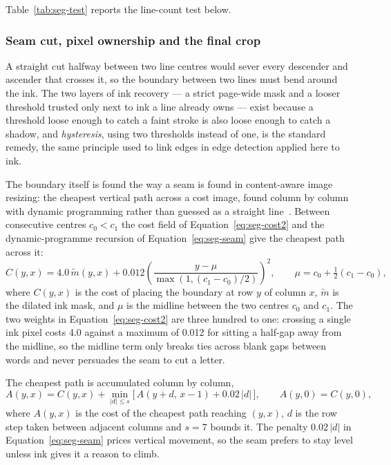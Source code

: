Table~\ref{tab:seg-test} reports the line-count test below.

\subsubsection{Seam cut, pixel ownership and the final crop}

A straight cut halfway between two line centres would sever every descender and ascender that crosses it, so the boundary between two lines must bend around the ink. The two layers of ink recovery --- a strict page-wide mask and a looser threshold trusted only next to ink a line already owns --- exist because a threshold loose enough to catch a faint stroke is also loose enough to catch a shadow, and \emph{hysteresis}, using two thresholds instead of one, is the standard remedy, the same principle used to link edges in edge detection applied here to ink.

The boundary itself is found the way a seam is found in content-aware image resizing: the cheapest vertical path across a cost image, found column by column with dynamic programming rather than guessed as a straight line~\cite[p.~10:3]{avidan2007}. Between consecutive centres $c_0<c_1$ the cost field of Equation~\ref{eq:seg-cost2} and the dynamic-programme recursion of Equation~\ref{eq:seg-seam} give the cheapest path across it:
\begin{equation}
C(y,x)=4.0\,\tilde m(y,x)+0.012\left(\frac{y-\mu}{\max(1,(c_1-c_0)/2)}\right)^{\!2},\qquad \mu=c_0+\tfrac12(c_1-c_0),
\label{eq:seg-cost2}
\end{equation}
where $C(y,x)$ is the cost of placing the boundary at row $y$ of column $x$, $\tilde m$ is the dilated ink mask, and $\mu$ is the midline between the two centres $c_0$ and $c_1$. The two weights in Equation~\ref{eq:seg-cost2} are three hundred to one: crossing a single ink pixel costs 4.0 against a maximum of 0.012 for sitting a half-gap away from the midline, so the midline term only breaks ties across blank gaps between words and never persuades the seam to cut a letter.

The cheapest path is accumulated column by column,
\begin{equation}
A(y,x)=C(y,x)+\min_{|d|\le s}\bigl[\,A(y+d,\,x-1)+0.02\,|d|\,\bigr],\qquad A(y,0)=C(y,0),
\label{eq:seg-seam}
\end{equation}
where $A(y,x)$ is the cost of the cheapest path reaching $(y,x)$, $d$ is the row step taken between adjacent columns and $s=7$ bounds it. The penalty $0.02\,|d|$ in Equation~\ref{eq:seg-seam} prices vertical movement, so the seam prefers to stay level unless ink gives it a reason to climb.

